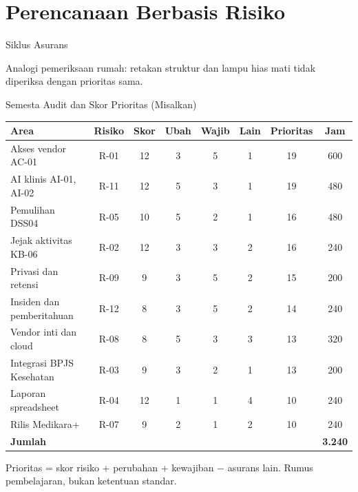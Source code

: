 \documentclass[aspectratio=169, table, 12pt]{beamer}
\begin{document}
\section{Perencanaan Berbasis Risiko}

\begin{frame}{{\Large Siklus Asurans}}
  \vspace{8pt}
  \begin{center}
    \resizebox{0.95\textwidth}{!}{}
  \end{center}
  \vspace{4pt}
  \small Analogi pemeriksaan rumah: retakan struktur dan lampu hias mati tidak diperiksa dengan
  prioritas sama.
\end{frame}

\begin{frame}{{\Large Semesta Audit dan Skor Prioritas (Misalkan)}}
  \vspace{0pt}
  \scriptsize
  \begin{tabularx}{\textwidth}{|>{\raggedright\arraybackslash}X|c|c|c|c|c|c|c|}
    \hline
    \textbf{Area} & \textbf{Risiko} & \textbf{Skor} & \textbf{Ubah} & \textbf{Wajib} &
    \textbf{Lain} & \textbf{Prioritas} & \textbf{Jam} \\ \hline
    Akses vendor AC-01 & R-01 & 12 & 3 & 5 & 1 & 19 & 600 \\ \hline
    AI klinis AI-01, AI-02 & R-11 & 12 & 5 & 3 & 1 & 19 & 480 \\ \hline
    Pemulihan DSS04 & R-05 & 10 & 5 & 2 & 1 & 16 & 480 \\ \hline
    Jejak aktivitas KB-06 & R-02 & 12 & 3 & 3 & 2 & 16 & 240 \\ \hline
    Privasi dan retensi & R-09 & 9 & 3 & 5 & 2 & 15 & 200 \\ \hline
    Insiden dan pemberitahuan & R-12 & 8 & 3 & 5 & 2 & 14 & 240 \\ \hline
    Vendor inti dan cloud & R-08 & 8 & 5 & 3 & 3 & 13 & 320 \\ \hline
    Integrasi BPJS Kesehatan & R-03 & 9 & 3 & 2 & 1 & 13 & 200 \\ \hline
    Laporan spreadsheet & R-04 & 12 & 1 & 1 & 4 & 10 & 240 \\ \hline
    Rilis Medikara+ & R-07 & 9 & 2 & 1 & 2 & 10 & 240 \\ \hline
    \textbf{Jumlah} & & & & & & & \textbf{3.240} \\ \hline
  \end{tabularx}

  \vspace{4pt}
  \scriptsize Prioritas = skor risiko + perubahan + kewajiban $-$ asurans lain. Rumus pembelajaran,
  bukan ketentuan standar.
\end{frame}
\end{document}
